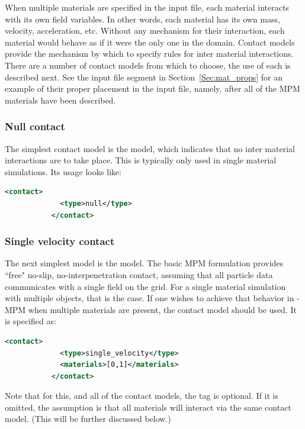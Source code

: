 When multiple materials are specified in the input file, each material
interacts with its own field variables.  In other words, each material has
its own mass, velocity, acceleration, etc.  Without any mechanism for their
interaction, each material would behave as if it were the only one in the
domain.  Contact models provide the mechanism by which to specify rules
for inter material interactions.  There are a number of contact models
from which to choose, the use of each is described next.  See the input
file segment in Section~\ref{Sec:mat_props} for an example of their proper
placement in the input file, namely, after all of the MPM materials have
been described.

\subsubsection{Null contact}
The simplest contact model is the  model, which indicates
that no inter material interactions are to take place.  This is typically only
used in single material simulations.  Its usage looks like:

\begin{lstlisting}[language=XML]
           <contact>
             <type>null</type>
           </contact>
\end{lstlisting}

\subsubsection{Single velocity contact}
The next simplest model is the  model.
The basic MPM formulation provides ``free" no-slip, no-interpenetration
contact, assuming that all particle data communicates with a single field
on the grid.  For a single material simulation with multiple objects, that
is the case.  If one wishes to achieve that behavior in \Vaango-MPM when
multiple materials are present, the  contact
model should be used.  It is specified as:

\begin{lstlisting}[language=XML]
           <contact>
             <type>single_velocity</type>
             <materials>[0,1]</materials>
           </contact>
\end{lstlisting}
Note that for this, and all of the contact models,
the  tag is optional.  If it is omitted,
the assumption is that all materials will interact via the same contact model.
(This will be further discussed below.)

